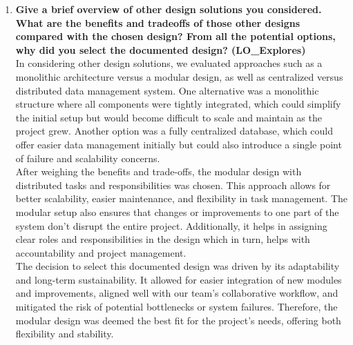 \documentclass[12pt, titlepage]{article}
\begin{document}
\begin{enumerate}
  \item \textbf{Give a brief overview of other design solutions you considered.  What
  are the benefits and tradeoffs of those other designs compared with the chosen
  design?  From all the potential options, why did you select the documented design?
  (LO\_Explores)}\\
  \newline
  In considering other design solutions, we evaluated approaches such as a monolithic architecture 
  versus a modular design, as well as centralized versus distributed data management system. One 
  alternative was a monolithic structure where all components were tightly integrated, which could simplify the 
  initial setup but would become difficult to scale and maintain as the project grew. Another option was a fully 
  centralized database, which could offer easier data management initially but could also introduce a single 
  point of failure and scalability concerns.\\
  \newline
  After weighing the benefits and trade-offs, the modular design with distributed tasks and responsibilities 
  was chosen. This approach allows for better scalability, easier maintenance, and flexibility in task management.
  The modular setup also ensures that changes or improvements to one part of the system don't disrupt the entire project.
  Additionally, it helps in assigning clear roles and responsibilities in the design which in turn, helps with accountability
  and project management.\\
  \newline
  The decision to select this documented design was driven by its adaptability and long-term sustainability. It allowed for 
  easier integration of new modules and improvements, aligned well with our team's collaborative workflow, and mitigated the
  risk of potential bottlenecks or system failures. Therefore, the modular design was deemed the best fit for the project's needs,
  offering both flexibility and stability.
\end{enumerate}
\end{document}
